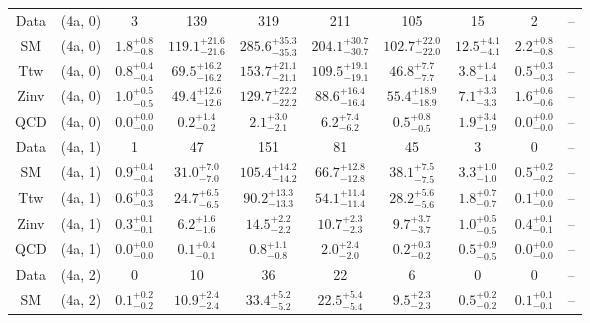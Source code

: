 \begin{table}[h!]
{\begin{tabular}{cccccccccc}
	Data & (4a, 0) & 3 & 139 & 319 & 211 & 105 & 15 & 2 & -- \\[0.5ex] 
	SM & (4a, 0) & $1.8^{+ 0.8 }_{- 0.8 }$ & $119.1^{+ 21.6 }_{- 21.6 }$ & $285.6^{+ 35.3 }_{- 35.3 }$ & $204.1^{+ 30.7 }_{- 30.7 }$ & $102.7^{+ 22.0 }_{- 22.0 }$ & $12.5^{+ 4.1 }_{- 4.1 }$ & $2.2^{+ 0.8 }_{- 0.8 }$ & -- \\[0.5ex] 
	Ttw & (4a, 0) & $0.8^{+ 0.4 }_{- 0.4 }$ & $69.5^{+ 16.2 }_{- 16.2 }$ & $153.7^{+ 21.1 }_{- 21.1 }$ & $109.5^{+ 19.1 }_{- 19.1 }$ & $46.8^{+ 7.7 }_{- 7.7 }$ & $3.8^{+ 1.4 }_{- 1.4 }$ & $0.5^{+ 0.3 }_{- 0.3 }$ & -- \\[0.5ex] 
	Zinv & (4a, 0) & $1.0^{+ 0.5 }_{- 0.5 }$ & $49.4^{+ 12.6 }_{- 12.6 }$ & $129.7^{+ 22.2 }_{- 22.2 }$ & $88.6^{+ 16.4 }_{- 16.4 }$ & $55.4^{+ 18.9 }_{- 18.9 }$ & $7.1^{+ 3.3 }_{- 3.3 }$ & $1.6^{+ 0.6 }_{- 0.6 }$ & -- \\[0.5ex] 
	QCD & (4a, 0) & $0.0^{+ 0.0 }_{- 0.0 }$ & $0.2^{+ 1.4 }_{- 0.2 }$ & $2.1^{+ 3.0 }_{- 2.1 }$ & $6.2^{+ 7.4 }_{- 6.2 }$ & $0.5^{+ 0.8 }_{- 0.5 }$ & $1.9^{+ 3.4 }_{- 1.9 }$ & $0.0^{+ 0.0 }_{- 0.0 }$ & -- \\[0.5ex] 
	Data & (4a, 1) & 1 & 47 & 151 & 81 & 45 & 3 & 0 & -- \\[0.5ex] 
	SM & (4a, 1) & $0.9^{+ 0.4 }_{- 0.4 }$ & $31.0^{+ 7.0 }_{- 7.0 }$ & $105.4^{+ 14.2 }_{- 14.2 }$ & $66.7^{+ 12.8 }_{- 12.8 }$ & $38.1^{+ 7.5 }_{- 7.5 }$ & $3.3^{+ 1.0 }_{- 1.0 }$ & $0.5^{+ 0.2 }_{- 0.2 }$ & -- \\[0.5ex] 
	Ttw & (4a, 1) & $0.6^{+ 0.3 }_{- 0.3 }$ & $24.7^{+ 6.5 }_{- 6.5 }$ & $90.2^{+ 13.3 }_{- 13.3 }$ & $54.1^{+ 11.4 }_{- 11.4 }$ & $28.2^{+ 5.6 }_{- 5.6 }$ & $1.8^{+ 0.7 }_{- 0.7 }$ & $0.1^{+ 0.0 }_{- 0.0 }$ & -- \\[0.5ex] 
	Zinv & (4a, 1) & $0.3^{+ 0.1 }_{- 0.1 }$ & $6.2^{+ 1.6 }_{- 1.6 }$ & $14.5^{+ 2.2 }_{- 2.2 }$ & $10.7^{+ 2.3 }_{- 2.3 }$ & $9.7^{+ 3.7 }_{- 3.7 }$ & $1.0^{+ 0.5 }_{- 0.5 }$ & $0.4^{+ 0.1 }_{- 0.1 }$ & -- \\[0.5ex] 
	QCD & (4a, 1) & $0.0^{+ 0.0 }_{- 0.0 }$ & $0.1^{+ 0.4 }_{- 0.1 }$ & $0.8^{+ 1.1 }_{- 0.8 }$ & $2.0^{+ 2.4 }_{- 2.0 }$ & $0.2^{+ 0.3 }_{- 0.2 }$ & $0.5^{+ 0.9 }_{- 0.5 }$ & $0.0^{+ 0.0 }_{- 0.0 }$ & -- \\[0.5ex] 
	Data & (4a, 2) & 0 & 10 & 36 & 22 & 6 & 0 & 0 & -- \\[0.5ex] 
	SM & (4a, 2) & $0.1^{+ 0.2 }_{- 0.2 }$ & $10.9^{+ 2.4 }_{- 2.4 }$ & $33.4^{+ 5.2 }_{- 5.2 }$ & $22.5^{+ 5.4 }_{- 5.4 }$ & $9.5^{+ 2.3 }_{- 2.3 }$ & $0.5^{+ 0.2 }_{- 0.2 }$ & $0.1^{+ 0.1 }_{- 0.1 }$ & -- \\[0.5ex] 

\end{tabular}}
\end{table}
